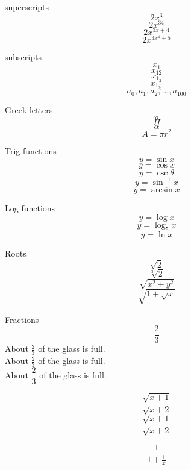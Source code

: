 \documentclass[12pt]{article}
\begin{document}
superscripts $$2x^3$$
$$2x^{34}$$
$$2x^{3x+4}$$
$$2x^{3x^4+5}$$

subscripts
$$x_1$$
$$x_{12}$$
$$x_{1_2}$$
$$x_{1_{2_3}}$$
$$a_0, a_1, a_2, \ldots, a_{100}$$

Greek letters
$$\pi$$
$$\Pi$$
$$\alpha$$
$$A = \pi r^2$$

Trig functions
$$y = \sin x$$
$$y = \cos x$$
$$y = \csc \theta$$
$$y = \sin^{-1} x$$
$$y = \arcsin x$$

Log functions
$$y = \log x$$
$$y = \log_5 x$$
$$y = \ln x$$

Roots
$$\sqrt{2}$$
$$\sqrt[3]{2}$$
$$\sqrt{x^2 + y^2}$$
$$\sqrt{1+\sqrt{x}}$$

Fractions
$$\frac{2}{3}$$
About $\displaystyle \frac{2}{3}$ of the glass is full.\\[6pt]
About $\frac{2}{3}$ of the glass is full.\\[6pt]
About $\dfrac{2}{3}$ of the glass is full.

$$\frac{\sqrt{x+1}}{\sqrt{x+2}}$$
$$\frac{\sqrt{x+1}}{\sqrt{x+2}}$$

$$\frac{1}{1+\frac{1}{x}}$$
\end{document}
